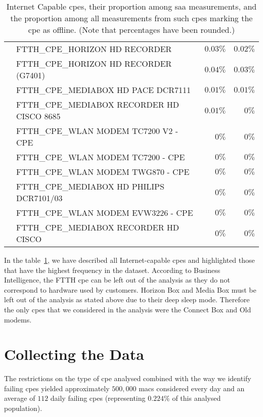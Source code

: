 \begin{table}[h]
\begin{center}
\begin{tabular}{c l r r}
									& FTTH\_CPE\_HORIZON HD RECORDER					& $0.03\%$ 				& $0.02\%$\\
									& FTTH\_CPE\_HORIZON HD RECORDER (G7401)			& $0.04\%$ 				& $0.03\%$\\
									& FTTH\_CPE\_MEDIABOX HD PACE DCR7111			& $0.01\%$ 				& $0.01\%$\\
									& FTTH\_CPE\_MEDIABOX RECORDER HD CISCO 8685	& $0.01\%$ 				& $0\%$\\
									& FTTH\_CPE\_WLAN MODEM TC7200 V2 - CPE			& $0\%$ 				& $0\%$\\
									& FTTH\_CPE\_WLAN MODEM TC7200 - CPE				& $0\%$ 				& $0\%$\\
									& FTTH\_CPE\_WLAN MODEM TWG870 - CPE				& $0\%$ 				& $0\%$\\
									& FTTH\_CPE\_MEDIABOX HD PHILIPS DCR7101/03		& $0\%$ 				& $0\%$\\
									& FTTH\_CPE\_WLAN MODEM EVW3226 - CPE			& $0\%$ 				& $0\%$\\
									& FTTH\_CPE\_MEDIABOX RECORDER HD CISCO			& $0\%$ 				& $0\%$\\

\end{tabular}
\end{center}
\caption{\label{CPEProportions}Internet Capable \acrshort{cpe}s, their proportion among \acrshort{saa} measurements, and the proportion among all measurements from such \acrshort{cpe}s marking the \acrshort{cpe} as offline. (Note that percentages have been rounded.)}
\end{table}

In the table~\ref{CPEProportions}, we have described all Internet-capable \acrshort{cpe}s and highlighted those that have the highest frequency in the dataset. According to Business Intelligence, the FTTH \acrshort{cpe} can be left out of the analysis as they do not correspond to hardware used by customers. Horizon Box and Media Box must be left out of the analysis as stated above due to their deep sleep mode. Therefore the only \acrshort{cpe}s that we considered in the analysis were the Connect Box and Old modems.

\section{Collecting the Data}
The restrictions on the type of \acrshort{cpe} analysed combined with the way we identify failing \acrshort{cpe}s yielded approximately $500,000$ \acrshort{mac}s considered every day and an average of $112$ daily failing \acrshort{cpe}s (representing $0.224\%$ of this analysed population).

